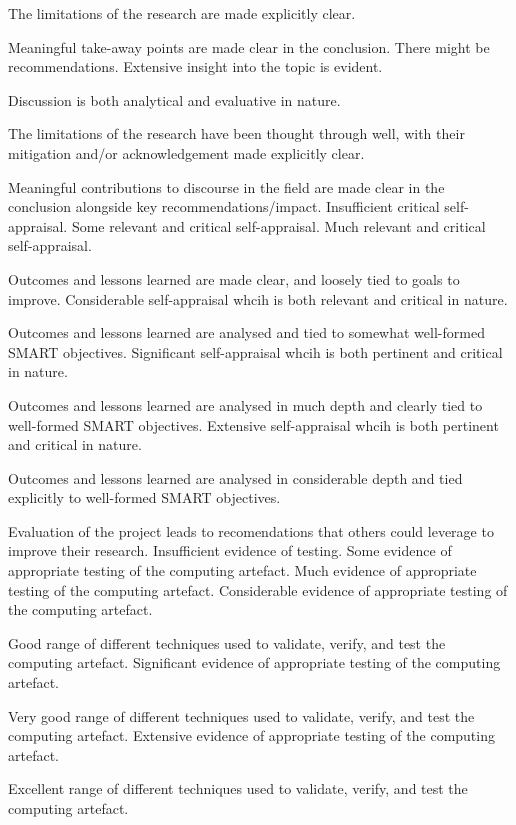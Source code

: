 \begin{markingrubric}
        \par		The limitations of the research are made explicitly clear.
        \par		Meaningful take-away points are made clear in the conclusion. There might be recommendations.
        \grade		Extensive insight into the topic is evident.
        \par		Discussion is both analytical and evaluative in nature.
        \par		The limitations of the research have been thought through well, with their mitigation and/or acknowledgement made explicitly clear.
        \par		Meaningful contributions to discourse in the field are made clear in the conclusion alongside key recommendations/impact.       
%
        \grade\fail  	Insufficient critical self-appraisal.
        \grade		Some relevant and critical self-appraisal.
        \grade		Much relevant and critical self-appraisal.
        \par		Outcomes and lessons learned are made clear, and loosely tied to goals to improve.
        \grade		Considerable self-appraisal whcih is both relevant and critical in nature.
        \par		Outcomes and lessons learned are analysed and tied to somewhat well-formed SMART objectives.
        \grade		Significant self-appraisal whcih is both pertinent and critical in nature.
        \par		Outcomes and lessons learned are analysed in much depth and clearly tied to well-formed SMART objectives.
        \grade		Extensive self-appraisal whcih is both pertinent and critical in nature.
        \par		Outcomes and lessons learned are analysed in considerable depth and tied explicitly to well-formed SMART objectives. 
       \par		Evaluation of the project leads to recomendations that others could leverage to improve their research. 
%
        \grade\fail       Insufficient evidence of testing.
        \grade		Some evidence of appropriate testing of the computing artefact.
        \grade		Much evidence of appropriate testing of the computing artefact.
        \grade		Considerable evidence of appropriate testing of the computing artefact.
        \par		Good range of different techniques used to validate, verify, and test the computing artefact.
        \grade		Significant evidence of appropriate testing of the computing artefact.
        \par		Very good range of different techniques used to validate, verify, and test the computing artefact.
        \grade		Extensive evidence of appropriate testing of the computing artefact.
        \par		Excellent range of different techniques used to validate, verify, and test the computing artefact.
\end{markingrubric}
